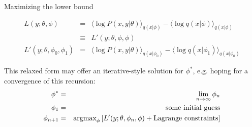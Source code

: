\documentclass{beamer}
\begin{document}
\begin{frame}{Maximizing the lower bound}

\begin{eqnarray*}
L(y;\theta,\phi) & = & \langle \log P(x,y|\theta) \rangle_{q(x|\phi)} - \langle \log q(x|\phi) \rangle_{q(x|\phi)} \\
& \equiv & L'(y;\theta,\phi,\phi) \\
L'(y;\theta,\phi_0,\phi_1) & = & \langle \log P(x,y|\theta) \rangle_{q(x|\phi_0)} - \langle \log q(x|\phi_1) \rangle_{q(x|\phi_0)}
\end{eqnarray*}

This relaxed form may offer an iterative-style solution for $\phi^\ast$,
e.g. hoping for a convergence of this recursion:
\begin{eqnarray*}
\phi^\ast & = & \lim_{n \to \infty} \phi_n \\
\phi_1 & = & \mbox{some initial guess} \\
\phi_{n+1} & = & {\mbox{argmax}}_{\phi} \left[ L'(y;\theta,\phi_n,\phi) + \mbox{Lagrange constraints} \right]
\end{eqnarray*}

\end{frame}
\end{document}
